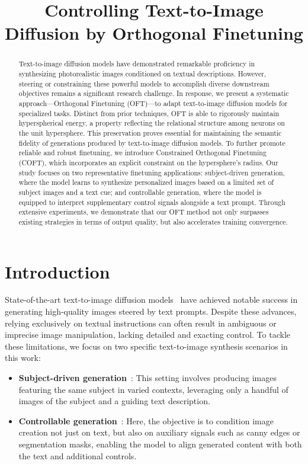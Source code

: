 \title{Controlling Text-to-Image Diffusion by Orthogonal Finetuning}

\begin{abstract}
Text-to-image diffusion models have demonstrated remarkable proficiency in synthesizing photorealistic images conditioned on textual descriptions. However, steering or constraining these powerful models to accomplish diverse downstream objectives remains a significant research challenge. In response, we present a systematic approach—Orthogonal Finetuning (OFT)—to adapt text-to-image diffusion models for specialized tasks. Distinct from prior techniques, OFT is able to rigorously maintain hyperspherical energy, a property reflecting the relational structure among neurons on the unit hypersphere. This preservation proves essential for maintaining the semantic fidelity of generations produced by text-to-image diffusion models. To further promote reliable and robust finetuning, we introduce Constrained Orthogonal Finetuning (COFT), which incorporates an explicit constraint on the hypersphere’s radius. Our study focuses on two representative finetuning applications: subject-driven generation, where the model learns to synthesize personalized images based on a limited set of subject images and a text cue; and controllable generation, where the model is equipped to interpret supplementary control signals alongside a text prompt. Through extensive experiments, we demonstrate that our OFT method not only surpasses existing strategies in terms of output quality, but also accelerates training convergence.
\end{abstract}

\section{Introduction}

State-of-the-art text-to-image diffusion models~\cite{saharia2022photorealistic,ramesh2022hierarchical,rombach2022high} have achieved notable success in generating high-quality images steered by text prompts. Despite these advances, relying exclusively on textual instructions can often result in ambiguous or imprecise image manipulation, lacking detailed and exacting control. To tackle these limitations, we focus on two specific text-to-image synthesis scenarios in this work:

\begin{itemize}[leftmargin=*,nosep]

    \item \textbf{Subject-driven generation}~\cite{ruiz2023dreambooth}: This setting involves producing images featuring the same subject in varied contexts, leveraging only a handful of images of the subject and a guiding text description.
    \item \textbf{Controllable generation}~\cite{zhang2023adding,mou2023t2i}: Here, the objective is to condition image creation not just on text, but also on auxiliary signals such as canny edges or segmentation masks, enabling the model to align generated content with both the text and additional controls.
\end{itemize}

